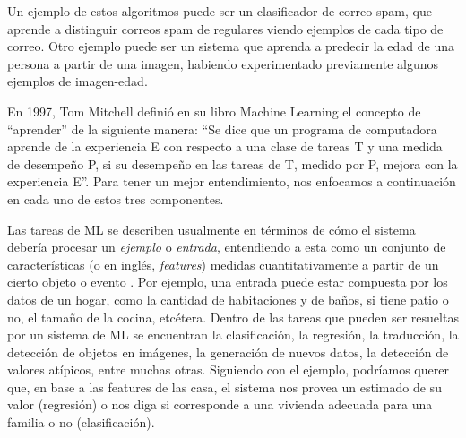 \documentclass[../../main.tex]{subfiles}
\begin{document}
Un ejemplo de estos algoritmos puede ser un clasificador de correo spam, que aprende a
distinguir correos spam de regulares viendo ejemplos de cada tipo de correo. Otro ejemplo
puede ser un sistema que aprenda a predecir la edad de una persona a partir de una imagen,
habiendo experimentado previamente algunos ejemplos de imagen-edad.

En 1997, Tom Mitchell definió en su libro Machine Learning \cite{ml-tom-mitchell} el
concepto de ``aprender'' de la siguiente manera: ``Se dice que un programa de computadora
aprende de la experiencia E con respecto a una clase de tareas T y una medida de desempeño
P, si su desempeño en las tareas de T, medido por P, mejora con la experiencia E''. Para
tener un mejor entendimiento, nos enfocamos a continuación en cada uno de estos tres
componentes.

Las tareas de ML se describen usualmente en términos de cómo el sistema debería procesar
un \textit{ejemplo} o \textit{entrada}, entendiendo a esta como un conjunto de
características (o en inglés, \textit{features}) medidas cuantitativamente a partir de un
cierto objeto o evento \cite{deep-learning}. Por ejemplo, una entrada puede estar
compuesta por los datos de un hogar, como la cantidad de habitaciones y de baños, si tiene
patio o no, el tamaño de la cocina, etcétera. Dentro de las tareas que pueden ser
resueltas por un sistema de ML se encuentran la clasificación, la regresión, la
traducción, la detección de objetos en imágenes, la generación de nuevos datos, la
detección de valores atípicos, entre muchas otras. Siguiendo con el ejemplo, podríamos
querer que, en base a las features de las casa, el sistema nos provea un estimado
de su valor (regresión) o nos diga si corresponde a una vivienda adecuada para una
familia o no (clasificación).
\end{document}
